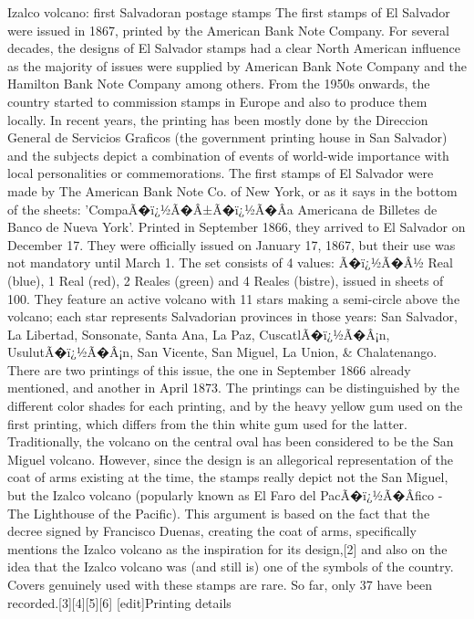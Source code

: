Izalco volcano: first Salvadoran postage stamps
The first stamps of El Salvador were issued in 1867, printed by the American Bank Note Company. For several decades, the designs of El Salvador stamps had a clear North American influence as the majority of issues were supplied by American Bank Note Company and the Hamilton Bank Note Company among others. From the 1950s onwards, the country started to commission stamps in Europe and also to produce them locally. In recent years, the printing has been mostly done by the Direccion General de Servicios Graficos (the government printing house in San Salvador) and the subjects depict a combination of events of world-wide importance with local personalities or commemorations.
The first stamps of El Salvador were made by The American Bank Note Co. of New York, or as it says in the bottom of the sheets: 'CompaÃ�ï¿½Ã�Â±Ã�ï¿½Ã�Â­a Americana de Billetes de Banco de Nueva York'. Printed in September 1866, they arrived to El Salvador on December 17. They were officially issued on January 17, 1867, but their use was not mandatory until March 1.
The set consists of 4 values: Ã�ï¿½Ã�Â½ Real (blue), 1 Real (red), 2 Reales (green) and 4 Reales (bistre), issued in sheets of 100. They feature an active volcano with 11 stars making a semi-circle above the volcano; each star represents Salvadorian provinces in those years: San Salvador, La Libertad, Sonsonate, Santa Ana, La Paz, CuscatlÃ�ï¿½Ã�Â¡n, UsulutÃ�ï¿½Ã�Â¡n, San Vicente, San Miguel, La Union, & Chalatenango.
There are two printings of this issue, the one in September 1866 already mentioned, and another in April 1873. The printings can be distinguished by the different color shades for each printing, and by the heavy yellow gum used on the first printing, which differs from the thin white gum used for the latter.
Traditionally, the volcano on the central oval has been considered to be the San Miguel volcano. However, since the design is an allegorical representation of the coat of arms existing at the time, the stamps really depict not the San Miguel, but the Izalco volcano (popularly known as El Faro del PacÃ�ï¿½Ã�Â­fico - The Lighthouse of the Pacific). This argument is based on the fact that the decree signed by Francisco Duenas, creating the coat of arms, specifically mentions the Izalco volcano as the inspiration for its design,[2] and also on the idea that the Izalco volcano was (and still is) one of the symbols of the country. Covers genuinely used with these stamps are rare. So far, only 37 have been recorded.[3][4][5][6]
[edit]Printing details

